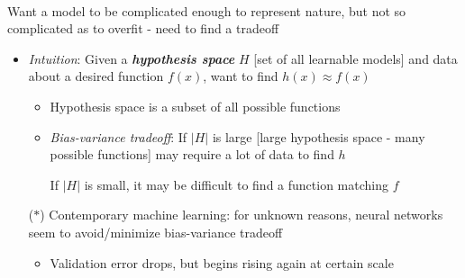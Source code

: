 \documentclass[12pt]{extarticle}
\theoremstyle{definition}
\theoremstyle{remark}
\newcommand{\pstart}[0]{\noindent}
\newcommand{\newp}[0]{~\\ \pstart}
\newcommand{\term}[1]{\noindent\textbf{\textit{#1}}}
\begin{document}
\newp
Want a model to be complicated enough to represent nature, but not so complicated as to overfit - need to find a tradeoff \begin{itemize}
    \item \textit{Intuition}: Given a \term{hypothesis space} $H$ [set of all learnable models] and data about a desired function $f(x)$, want to find $h(x)\approx f(x)$ \begin{itemize}
        \item Hypothesis space is a subset of all possible functions
        \item \textit{Bias-variance tradeoff}: If $|H|$ is large [large hypothesis space - many possible functions] may require a lot of data to find $h$
        
        If $|H|$ is small, it may be difficult to find a function matching $f$
    \end{itemize}
    \item[($\ast$)] Contemporary machine learning: for unknown reasons, neural networks seem to avoid/minimize bias-variance tradeoff \begin{itemize}
        \item Validation error drops, but begins rising again at certain scale
    \end{itemize}
\end{itemize}
\end{document}
